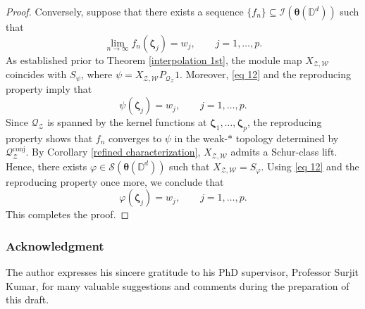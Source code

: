 \documentclass[12pt,reqno]{amsart}
\theoremstyle{remark}
\theoremstyle{definition}
\begin{document}
\begin{proof}
Conversely, suppose that there exists a sequence $\{f_n\}\subseteq \mathcal{I}(\boldsymbol \theta(\mathbb D^d))$ such that $$ \lim_{n\to\infty} f_n(\boldsymbol{\zeta}_j)=w_j, \qquad j=1,\ldots,p.$$ 
As established prior to Theorem \ref{interpolation 1st}, the module map $X_{\mathcal{Z,W}}$ coincides with $S_{\psi}$, where $\psi= X_{\mathcal{Z,W}}P_{\mathcal{Q}_{\mathcal{Z}}}1.$ Moreover, \eqref{eq 12} and the reproducing property imply that $$\psi(\boldsymbol \zeta_j)=w_j, \qquad j=1,\ldots, p.$$
Since $\mathcal Q_{\mathcal Z}$ is spanned by the kernel functions at
$\boldsymbol\zeta_1,\ldots,\boldsymbol\zeta_p$, the reproducing property shows that $f_n$ converges to $\psi$ in the weak-$*$ topology determined by
$\mathcal Q_{\mathcal Z}^{\operatorname{conj}}$. By Corollary \ref{refined characterization}, $X_{\mathcal Z,\mathcal W}$ admits a Schur-class lift.
Hence, there exists $\varphi\in\mathcal S(\boldsymbol\theta(\mathbb D^d))$ such that $X_{\mathcal{Z,W}}=S_{\varphi}.$
Using \eqref{eq 12} and the reproducing property once more, we conclude that
    $$\varphi(\boldsymbol \zeta_j)=w_j, \qquad j=1,\ldots,p.$$ This completes the proof.
\end{proof}


  \subsubsection*{Acknowledgment} The author expresses his sincere gratitude to his PhD supervisor, Professor Surjit Kumar, for many valuable suggestions and comments during the preparation of this draft.
\end{document}
